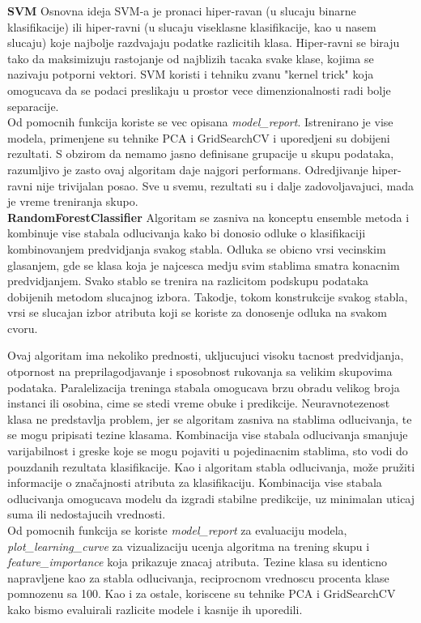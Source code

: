\documentclass[10pt]{article}
\begin{document}
\textbf{SVM}
 Osnovna ideja SVM-a je pronaci hiper-ravan (u slucaju binarne klasifikacije) ili hiper-ravni (u slucaju viseklasne klasifikacije, kao u nasem slucaju) koje najbolje razdvajaju podatke razlicitih klasa. Hiper-ravni se biraju tako da maksimizuju rastojanje od najblizih tacaka svake klase, kojima se nazivaju potporni vektori. SVM koristi i tehniku zvanu "kernel trick" koja omogucava da se podaci preslikaju u prostor vece dimenzionalnosti radi bolje separacije.
\\

Od pomocnih funkcija koriste se vec opisana \textit{model\_report}. Istrenirano je vise modela, primenjene su tehnike PCA i GridSearchCV i uporedjeni su dobijeni rezultati. S obzirom da nemamo jasno definisane grupacije u skupu podataka, razumljivo je zasto ovaj algoritam daje najgori performans. Odredjivanje hiper-ravni nije trivijalan posao. Sve u svemu, rezultati su i dalje zadovoljavajuci, mada je vreme treniranja skupo. \\

\textbf{RandomForestClassifier}
Algoritam se zasniva na konceptu ensemble metoda i kombinuje vise stabala odlucivanja kako bi donosio odluke o klasifikaciji kombinovanjem predvidjanja svakog stabla. Odluka se obicno vrsi vecinskim glasanjem, gde se klasa koja je najcesca medju svim stablima smatra konacnim predvidjanjem. Svako stablo se trenira na razlicitom podskupu podataka dobijenih metodom slucajnog izbora. Takodje, tokom konstrukcije svakog stabla, vrsi se slucajan izbor atributa koji se koriste za donosenje odluka na svakom cvoru.

Ovaj algoritam ima nekoliko prednosti, ukljucujuci visoku tacnost predvidjanja, otpornost na preprilagodjavanje i sposobnost rukovanja sa velikim skupovima podataka. Paralelizacija treninga stabala omogucava brzu obradu velikog broja instanci ili osobina, cime se stedi vreme obuke i predikcije. Neuravnotezenost klasa ne predstavlja problem, jer se algoritam zasniva na stablima odlucivanja, te se mogu pripisati tezine klasama. Kombinacija vise stabala odlucivanja smanjuje varijabilnost i greske koje se mogu pojaviti u pojedinacnim stablima, sto vodi do pouzdanih rezultata klasifikacije. Kao i algoritam stabla odlucivanja, može pružiti informacije o značajnosti atributa za klasifikaciju. Kombinacija vise stabala odlucivanja omogucava modelu da izgradi stabilne predikcije, uz minimalan uticaj suma ili nedostajucih vrednosti.\\

Od pomocnih funkcija se koriste \textit{model\_report} za evaluaciju modela,\\ \textit{plot\_learning\_curve} za vizualizaciju ucenja algoritma na trening skupu i \textit{feature\_importance} koja prikazuje znacaj atributa. Tezine klasa su identicno napravljene kao za stabla odlucivanja, reciprocnom vrednoscu procenta klase pomnozenu sa 100. Kao i za ostale, koriscene su tehnike PCA i GridSearchCV kako bismo evaluirali razlicite modele i kasnije ih uporedili.
\end{document}

